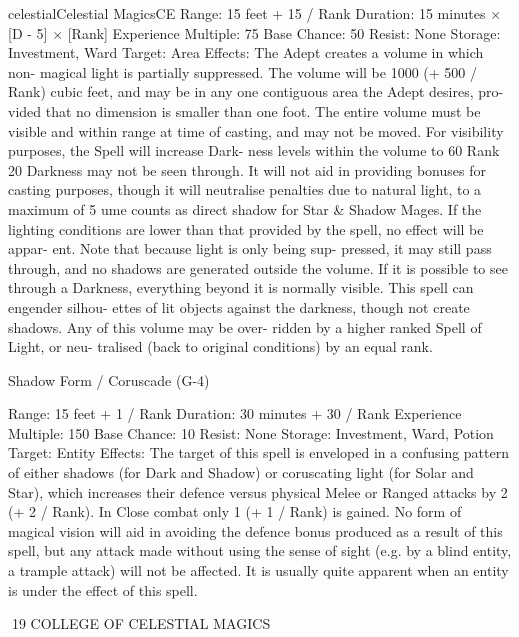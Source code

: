 \begin{College}[1.3]{celestial}{Celestial Magics}{CE}
Range: 15 feet + 15 / Rank 
Duration: 15 minutes × [D - 5] × [Rank] 
Experience Multiple: 75 
Base Chance: 50%
Resist: None 
Storage: Investment, Ward 
Target: Area 
Effects: The Adept creates a volume in which non-
magical  light  is  partially  suppressed.  The  volume 
will be 1000 (+ 500 / Rank) cubic feet, and may be 
in any one contiguous area the Adept desires, pro-
vided  that  no  dimension  is  smaller  than  one  foot. 
The entire volume must be visible and within range 
at  time  of  casting,  and  may  not  be  moved.  For 
visibility  purposes,  the  Spell  will  increase  Dark-
ness levels within the volume to 60%
Rank 20 Darkness may not be seen through. It will 
not  aid  in  providing  bonuses  for  casting  purposes, 
though  it  will  neutralise  penalties  due  to  natural 
light, to a maximum of 5%
ume  counts  as  direct  shadow  for  Star  \&  Shadow 
Mages.  If  the  lighting  conditions  are  lower  than 
that provided by the spell, no effect will be appar-
ent.  Note  that  because  light  is  only  being  sup-
pressed, it may still pass through, and no shadows 
are generated outside the volume. If it is possible to 
see  through  a  Darkness,  everything  beyond  it  is 
normally  visible.  This  spell  can  engender  silhou-
ettes of lit objects against the darkness, though not 
create  shadows.  Any  of  this  volume  may  be  over-
ridden  by  a  higher  ranked  Spell  of  Light,  or  neu-
tralised  (back  to  original  conditions)  by  an  equal 
rank. 

Shadow Form / Coruscade (G-4) 

Range: 15 feet + 1 / Rank 
Duration: 30 minutes + 30 / Rank 
Experience Multiple: 150 
Base Chance: 10%
Resist: None 
Storage: Investment, Ward, Potion 
Target: Entity 
Effects:  The  target  of  this  spell  is  enveloped  in  a 
confusing  pattern  of  either  shadows  (for  Dark  and 
Shadow)  or  coruscating  light  (for  Solar  and  Star), 
which  increases  their  defence  versus  physical 
Melee  or  Ranged  attacks  by  2  (+  2  /  Rank).  In 
Close  combat  only  1  (+  1  /  Rank)  is  gained.  No 
form  of  magical  vision  will  aid  in  avoiding  the 
defence bonus produced as a result of this spell, but 
any  attack  made  without  using  the  sense  of  sight 
(e.g. by a blind entity, a trample attack) will not be 
affected. It is usually quite apparent when an entity 
is under the effect of this spell. 

19 COLLEGE OF CELESTIAL MAGICS 


\end{College}
